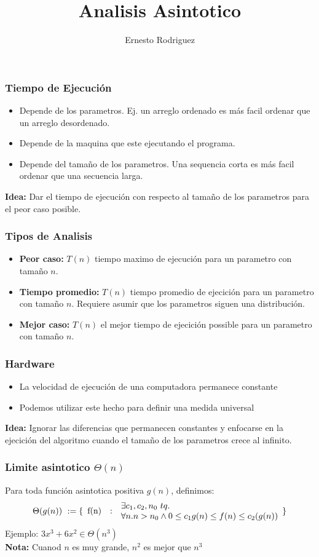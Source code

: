 \documentclass{beamer}
\title[Git]{Analisis Asintotico}
\author{Ernesto Rodriguez}
\institute{
    Universidad del Itsmo \\
    \medskip \textit{erodriguez@unis.edu.gt}
}
\date[\today]{}
\begin{document}
\begin{frame}
\titlepage
\end{frame}

\begin{frame}
\frametitle{Tiempo de Ejecuci\'on}
\begin{itemize}
    \item{Depende de los parametros. Ej. un arreglo ordenado
    es m\'as facil ordenar que un arreglo desordenado.}
    \item{Depende de la maquina que este ejecutando el programa.}
    \item{Depende del tama\~no de los parametros. Una sequencia
    corta es m\'as facil ordenar que una secuencia larga.}
\end{itemize}
{\bf Idea: } Dar el tiempo de ejecuci\'on con respecto al tama\~no de los parametros para
el peor caso posible.
\end{frame}

\begin{frame}
\frametitle{Tipos de Analisis}
\begin{itemize}
    \item{{\bf Peor caso: }$T(n)$ tiempo maximo de ejecuci\'on para un parametro con tama\~no $n$.}
    \item{{\bf Tiempo promedio: }$T(n)$ tiempo promedio de ejecici\'on para un parametro con tama\~no $n$.
        Requiere asumir que los parametros siguen una distribuci\'on.}
    \item{{\bf Mejor caso: } $T(n)$ el mejor tiempo de ejecici\'on possible para un parametro
        con tama\~no $n$.}
\end{itemize}
\end{frame}

\begin{frame}
\frametitle{Hardware}
\begin{itemize}
    \item{La velocidad de ejecuci\'on de una computadora permanece constante}
    \item{Podemos utilizar este hecho para definir una medida universal}
\end{itemize}
{\bf Idea: } Ignorar las diferencias que permanecen constantes y enfocarse
en la ejecici\'on del algoritmo cuando el tama\~no de los parametros crece al infinito.
\end{frame}

\begin{frame}
\frametitle{Limite asintotico $\Theta(n)$}
Para toda funci\'on asintotica positiva $g(n)$, definimos:
\[
    \Theta(g(n))\ :=\{
        \begin{array}{l c l}
            \multirow{2}{*}{f(n)} & \multirow{2}{*}{:} & \exists c_1, c_2, n_0\ tq. \\
            & & \forall n. n>n_0 \wedge 0 \leq c_1g(n) \leq f(n)\leq c_2(g(n))
        \end{array}
    \}
\]
Ejemplo: $3x^3 + 6x^2\in \Theta(n^3)$
\\
{\bf Nota: } Cuanod $n$ es muy grande, $n^2$ es mejor que $n^3$
\end{frame}
\end{document}
